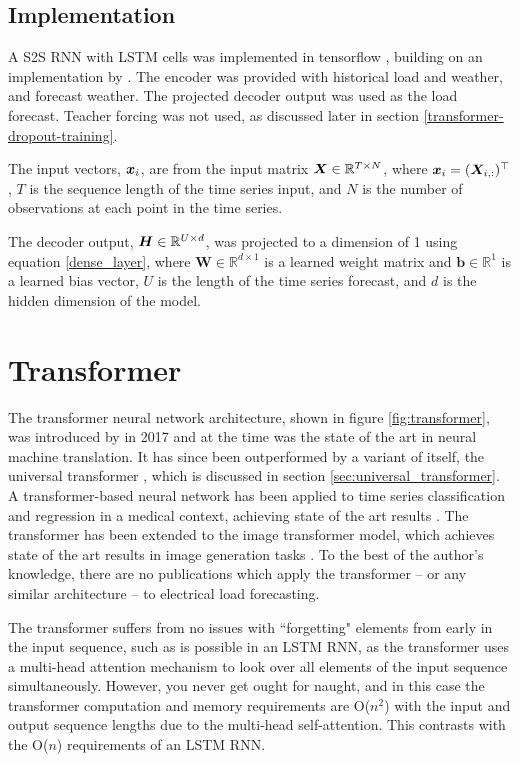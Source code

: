 \subsection{Implementation}
A S2S RNN with LSTM cells was implemented in tensorflow \cite{tensorflow2015-whitepaper}, building on an implementation by \citet{Chevalier2017}.
The encoder was provided with historical load and weather, and forecast weather.
The projected decoder output was used as the load forecast.
Teacher forcing was not used, as discussed later in section \ref{transformer-dropout-training}.

The input vectors, ${\bm{x}}_i$, are from the input matrix ${\bm{X}} \in \mathbb{R}^{T \times N}$, where ${\bm{x}}_i = ({\bm{X}}_{i,:})^\top$, $T$ is the sequence length of the time series input, and $N$ is the number of observations at each point in the time series.

The decoder output, ${\bm{H}} \in \mathbb{R}^{U \times d}$, was projected to a dimension of 1 using equation \ref{dense_layer}, where $\boldsymbol{W} \in \mathbb{R}^{d \times 1}$ is a learned weight matrix and $\boldsymbol{b} \in \mathbb{R}^{1}$ is a learned bias vector, $U$ is the length of the time series forecast, and $d$ is the hidden dimension of the model.

\section{Transformer} \label{sec:transformer}
The transformer neural network architecture, shown in figure \ref{fig:transformer}, was introduced by \citet{Vaswani2017} in 2017 and at the time was the state of the art in neural machine translation.
It has since been outperformed by a variant of itself, the universal transformer \cite{Dehghani2018}, which is discussed in section \ref{sec:universal_transformer}.
A transformer-based neural network has been applied to time series classification and regression in a medical context, achieving state of the art results \cite{Song2017}.
The transformer has been extended to the image transformer model, which achieves state of the art results in image generation tasks \cite{Parmar2018}.
To the best of the author's knowledge, there are no publications which apply the transformer -- or any similar architecture -- to electrical load forecasting.

The transformer suffers from no issues with ``forgetting" elements from early in the input sequence, such as is possible in an LSTM RNN, as the transformer uses a multi-head attention mechanism to look over all elements of the input sequence simultaneously.
However, you never get ought for naught, and in this case the transformer computation and memory requirements are O($n^2$) with the input and output sequence lengths due to the multi-head self-attention.
This contrasts with the O($n$) requirements of an LSTM RNN.

